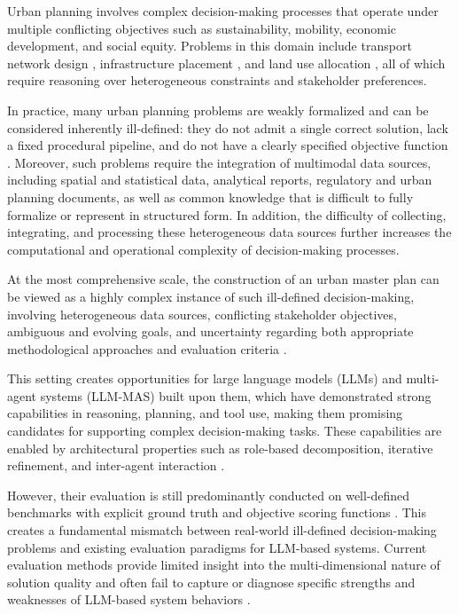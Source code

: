 Urban planning involves complex decision-making processes that operate under multiple conflicting objectives such as sustainability, mobility, economic development, and social equity.
Problems in this domain include transport network design \cite{owais2026transit, morozov2026one}, infrastructure placement \cite{fugaro2025multi, churiakova2025constrained}, and land use allocation \cite{xiao2025land, rahman2021multi}, all of which require reasoning over heterogeneous constraints and stakeholder preferences.

In practice, many urban planning problems are weakly formalized and can be considered inherently ill-defined: they do not admit a single correct solution, lack a fixed procedural pipeline, and do not have a clearly specified objective function \cite{zhou2026evaluating}.
Moreover, such problems require the integration of multimodal data sources, including spatial and statistical data, analytical reports, regulatory and urban planning documents, as well as common knowledge that is difficult to fully formalize or represent in structured form.
In addition, the difficulty of collecting, integrating, and processing these heterogeneous data sources further increases the computational and operational complexity of decision-making processes.

At the most comprehensive scale, the construction of an urban master plan can be viewed as a highly complex instance of such ill-defined decision-making, involving heterogeneous data sources, conflicting stakeholder objectives, ambiguous and evolving goals, and uncertainty regarding both appropriate methodological approaches and evaluation criteria \cite{rittel1973dilemmas}.

This setting creates opportunities for large language models (LLMs) and multi-agent systems (LLM-MAS) built upon them, which have demonstrated strong capabilities in reasoning, planning, and tool use, making them promising candidates for supporting complex decision-making tasks.
These capabilities are enabled by architectural properties such as role-based decomposition, iterative refinement, and inter-agent interaction \cite{yao2023react, han2025exploring}.

However, their evaluation is still predominantly conducted on well-defined benchmarks with explicit ground truth and objective scoring functions \cite{hendrycks2020measuring, cobbe2021training}.
This creates a fundamental mismatch between real-world ill-defined decision-making problems and existing evaluation paradigms for LLM-based systems.
Current evaluation methods provide limited insight into the multi-dimensional nature of solution quality and often fail to capture or diagnose specific strengths and weaknesses of LLM-based system behaviors \cite{zhou2026evaluating}.

